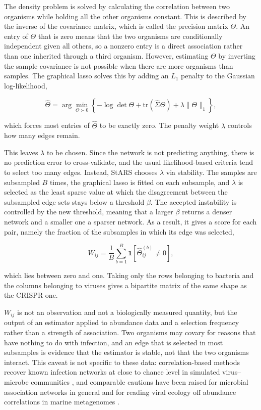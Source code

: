 The density problem is solved by calculating the correlation between two organisms while holding all the other
organisms constant. This is described by the inverse of the covariance matrix, which is called the precision matrix $\Theta$.
An entry of $\Theta$ that is zero means that the two organisms are conditionally independent given all others, 
so a nonzero entry is a direct association rather than one inherited through a third organism. However, 
estimating $\Theta$ by inverting the sample covariance is not possible when there are more organisms than 
samples. The graphical lasso \citep{friedman2008} solves this by adding an $L_1$ penalty to the Gaussian log-likelihood,

\begin{equation}
\label{eq:glasso}
\hat{\Theta} = \arg\min_{\Theta \succ 0} \left\{ -\log\det\Theta + \mathrm{tr}(\hat{\Sigma}\Theta)
+ \lambda \|\Theta\|_1 \right\} ,
\end{equation}

which forces most entries of $\hat{\Theta}$ to be exactly zero. The penalty weight $\lambda$
controls how many edges remain.

This leaves $\lambda$ to be chosen. Since the network is not predicting anything, there is no prediction error 
to cross-validate, and the usual likelihood-based criteria tend to select too many edges. Instead, 
StARS \citep{liu2010} chooses $\lambda$ via stability. The samples are subsampled
$B$ times, the graphical lasso is fitted on each subsample, and $\lambda$ is selected as the least sparse value at
which the disagreement between the subsampled edge sets stays below a threshold $\beta$. The accepted instability
is controlled by the new threshold, meaning that a larger $\beta$ returns a denser network and a smaller one a
sparser network. As a result, it gives a score for each pair, namely the fraction of the subsamples in which its 
edge was selected,

\begin{equation}
\label{eq:stars}
W_{ij} = \frac{1}{B} \sum_{b=1}^{B} \mathbf{1}\!\left[ \hat{\Theta}^{(b)}_{ij} \neq 0 \right] ,
\end{equation}

which lies between zero and one. Taking only the rows belonging to bacteria and the columns belonging to 
viruses gives a bipartite matrix of the same shape as the CRISPR one.

$W_{ij}$ is not an observation and not a biologically measured quantity,
but the output of an estimator applied to abundance data and a selection frequency rather than a strength of 
association. Two organisms may covary for reasons that have nothing to do with infection, and an edge that is 
selected in most subsamples is evidence that the estimator is stable, not that the two organisms interact.
This caveat is not specific to these data: correlation-based methods recover known infection networks at close
to chance level in simulated virus--microbe communities \citep{coenen2018}, and comparable cautions have been
raised for microbial association networks in general \citep{pinto2022} and for reading viral ecology off
abundance correlations in marine metagenomes \citep{alrasheed2019}.

